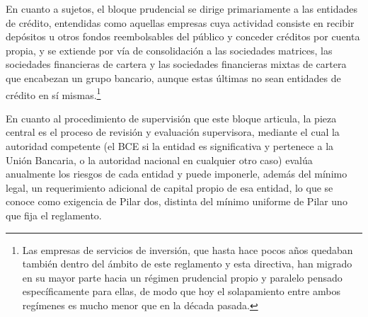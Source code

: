 \documentclass[10pt,a4paper]{article}
\begin{document}
En cuanto a sujetos, el bloque prudencial se dirige primariamente a las entidades de crédito, entendidas como aquellas empresas cuya actividad consiste en recibir depósitos u otros fondos reembolsables del público y conceder créditos por cuenta propia, y se extiende por vía de consolidación a las sociedades matrices, las sociedades financieras de cartera y las sociedades financieras mixtas de cartera que encabezan un grupo bancario, aunque estas últimas no sean entidades de crédito en sí mismas.\footnote{
Las empresas de servicios de inversión, que hasta hace pocos años quedaban también dentro del ámbito de este reglamento y esta directiva, han migrado en su mayor parte hacia un régimen prudencial propio y paralelo pensado específicamente para ellas, de modo que hoy el solapamiento entre ambos regímenes es mucho menor que en la década pasada. 
}

En cuanto al procedimiento de supervisión que este bloque articula, la pieza central es el proceso de revisión y evaluación supervisora, mediante el cual la autoridad competente (el BCE si la entidad es significativa y pertenece a la Unión Bancaria, o la autoridad nacional en cualquier otro caso) evalúa anualmente los riesgos de cada entidad y puede imponerle, además del mínimo legal, un requerimiento adicional de capital propio de esa entidad, lo que se conoce como exigencia de Pilar dos, distinta del mínimo uniforme de Pilar uno que fija el reglamento.
\end{document}
